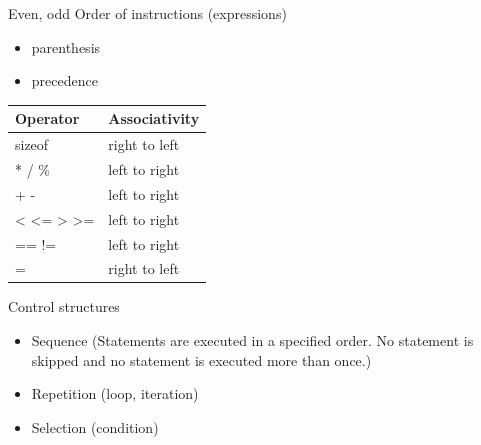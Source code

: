 \documentclass[usenames,dvipsnames,aspectratio=169]{beamer}
\begin{document}
\begin{frame}{Even, odd}
  Order of instructions (expressions)
  \begin{itemize}
    \item parenthesis
    \item precedence
  \end{itemize}
  \begin{center}
    \begin{tabular}{ll}
    Operator & Associativity\\ \hline
    sizeof & right to left\\
    * / \% & left to right\\
    + - & left to right\\
    < <= > >= & left to right\\
    == != & left to right\\
    = & right to left\\
    \end{tabular}
  \end{center}
  Control structures
  \begin{itemize}
    \item Sequence (Statements are executed in a specified order. No statement is skipped and no statement is executed more than once.)
    \item Repetition (loop, iteration)
    \item Selection (condition)
  \end{itemize}
\end{frame}
\end{document}
